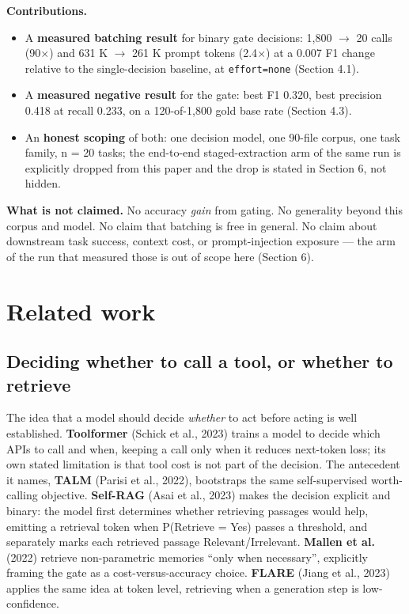 \documentclass[10pt]{article}
\begin{document}
\textbf{Contributions.}

\begin{itemize}
\item A \textbf{measured batching result} for binary gate decisions: 1,800 $\to$ 20 calls (90$\times$) and 631 K $\to$ 261 K prompt tokens (2.4$\times$) at a 0.007 F1 change relative to the single-decision baseline, at \texttt{effort=none} (Section 4.1).
\item A \textbf{measured negative result} for the gate: best F1 0.320, best precision 0.418 at recall 0.233, on a 120-of-1,800 gold base rate (Section 4.3).
\item An \textbf{honest scoping} of both: one decision model, one 90-file corpus, one task family, n = 20 tasks; the end-to-end staged-extraction arm of the same run is explicitly dropped from this paper and the drop is stated in Section 6, not hidden.
\end{itemize}

\textbf{What is not claimed.} No accuracy \emph{gain} from gating. No generality beyond this corpus and model. No claim that batching is free in general. No claim about downstream task success, context cost, or prompt-injection exposure --- the arm of the run that measured those is out of scope here (Section 6).

\section{Related work}

\subsection{Deciding whether to call a tool, or whether to retrieve}

The idea that a model should decide \emph{whether} to act before acting is well established. \textbf{Toolformer} (Schick et al., 2023)\cite{ref11} trains a model to decide which APIs to call and when, keeping a call only when it reduces next-token loss; its own stated limitation is that tool cost is not part of the decision. The antecedent it names, \textbf{TALM} (Parisi et al., 2022)\cite{ref9}, bootstraps the same self-supervised worth-calling objective. \textbf{Self-RAG} (Asai et al., 2023)\cite{ref1} makes the decision explicit and binary: the model first determines whether retrieving passages would help, emitting a retrieval token when P(Retrieve = Yes) passes a threshold, and separately marks each retrieved passage Relevant/Irrelevant. \textbf{Mallen et al.} (2022)\cite{ref7} retrieve non-parametric memories ``only when necessary'', explicitly framing the gate as a cost-versus-accuracy choice. \textbf{FLARE} (Jiang et al., 2023)\cite{ref5} applies the same idea at token level, retrieving when a generation step is low-confidence.
\end{document}

